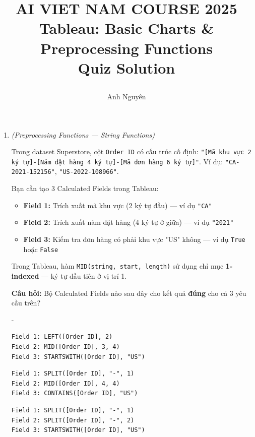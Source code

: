 \documentclass[12pt]{article}
\title{
  \begin{center}
    \Large {AI VIET NAM COURSE 2025}\\[.5ex]
    \Huge \textbf{Tableau: Basic Charts \& Preprocessing Functions}\\[.5ex]
    \large Quiz Solution
  \end{center}
}
\author{Anh Nguyên}
\date{}
\newcounter{choice}
\renewcommand\thechoice{($\alph{choice}$)}
\newcommand\choicelabel{\thechoice}
\newenvironment{choices}%
  {\list{\choicelabel}%
     {\usecounter{choice}\def\makelabel##1{\hss\llap{##1}}%
       \settowidth{\leftmargin}{W.\hskip\labelsep\hskip 0 em}%
       \def\choice{%
         \item
       } %
       \labelwidth\leftmargin\advance\labelwidth-\labelsep
       \topsep=0pt
       \partopsep=0pt
     }%
  }%
  {\endlist}
\begin{document}
\maketitle

\begin{enumerate}[label=\textbf{Câu \arabic*.}, leftmargin=*, labelsep=1em, itemsep=2em]


\item \textit{(Preprocessing Functions --- String Functions)}

Trong dataset Superstore, cột \texttt{Order ID} có cấu trúc cố định: \texttt{"[Mã khu vực 2 ký tự]-[Năm đặt hàng 4 ký tự]-[Mã đơn hàng 6 ký tự]"}. Ví dụ: \texttt{"CA-2021-152156"}, \texttt{"US-2022-108966"}.

Bạn cần tạo 3 Calculated Fields trong Tableau:
\begin{itemize}
    \item \textbf{Field 1:} Trích xuất mã khu vực (2 ký tự đầu) --- ví dụ \texttt{"CA"}
    \item \textbf{Field 2:} Trích xuất năm đặt hàng (4 ký tự ở giữa) --- ví dụ \texttt{"2021"}
    \item \textbf{Field 3:} Kiểm tra đơn hàng có phải khu vực "US" không --- ví dụ \texttt{True} hoặc \texttt{False}
\end{itemize}

\begin{notebox}
Trong Tableau, hàm \texttt{MID(string, start, length)} sử dụng chỉ mục \textbf{1-indexed} --- ký tự đầu tiên ở vị trí 1.
\end{notebox}

\textbf{Câu hỏi:} Bộ Calculated Fields nào sau đây cho kết quả \textbf{đúng} cho cả 3 yêu cầu trên?

\begin{choices}
    \choice
    \begin{lstlisting}[style=tableau]
Field 1: LEFT([Order ID], 2)
Field 2: MID([Order ID], 3, 4)
Field 3: STARTSWITH([Order ID], "US")
    \end{lstlisting}

    \choice
    \begin{lstlisting}[style=tableau]
Field 1: SPLIT([Order ID], "-", 1)
Field 2: MID([Order ID], 4, 4)
Field 3: CONTAINS([Order ID], "US")
    \end{lstlisting}

    \choice
    \begin{lstlisting}[style=tableau]
Field 1: SPLIT([Order ID], "-", 1)
Field 2: SPLIT([Order ID], "-", 2)
Field 3: STARTSWITH([Order ID], "US")
    \end{lstlisting}


\end{choices}
\end{enumerate}
\end{document}
